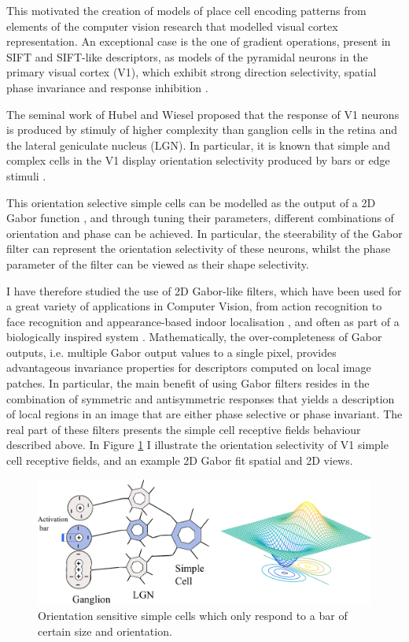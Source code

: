 This motivated the creation of models of place cell encoding patterns from elements of the computer vision research that modelled visual cortex representation. An exceptional case is the one of gradient operations, present in SIFT and SIFT-like descriptors, as models of the pyramidal neurons in the primary visual cortex (V1), which exhibit strong direction selectivity, spatial phase invariance and response inhibition \cite{hubel1962receptive, dhruv2014cascaded,carandini2006simple}.

The seminal work of Hubel and Wiesel \cite{hubel1962receptive} proposed that the response of V1 neurons is produced by stimuly of higher complexity than ganglion cells in the retina and the lateral geniculate nucleus (LGN). In particular, it is known that simple and complex cells in the V1 display orientation selectivity produced by bars or edge stimuli \cite{payne2001cat}.

This orientation selective simple cells can be modelled as the output of a 2D Gabor function \cite{daugman1985uncertainty}, and through tuning their parameters, different combinations of orientation and phase can be achieved. In particular, the steerability of the Gabor filter can represent the orientation selectivity of these neurons, whilst the phase parameter of the filter can be viewed as their shape selectivity. 

I have therefore studied the use of 2D Gabor-like filters, which have been used for a great variety of applications in Computer Vision, from action recognition \cite{shu2014bio} to face recognition \cite{liao2013partial} and appearance-based indoor localisation \cite{Rivera-Rubio2015PRL}, and often as part of a biologically inspired system \cite{shu2014bio}. Mathematically, the over-completeness of Gabor outputs, i.e. multiple Gabor output values to a single pixel, provides advantageous invariance properties for descriptors computed on local image patches. In particular, the main benefit of using Gabor filters resides in the combination of symmetric and antisymmetric responses that yields a description of local regions in an image that are either phase selective or phase invariant. The real part of these filters presents the simple cell receptive fields behaviour described above. In Figure \ref{fig:simple_cell} I illustrate the orientation selectivity of V1 simple cell receptive fields, and an example 2D Gabor fit spatial and 2D views.


\begin{figure}[h]
\centering
\includegraphics[width=.8\textwidth]{gfx/Chapter05/simple_cell_gabor.pdf}
\caption{Orientation sensitive simple cells which only respond to a bar of certain size and orientation.}
\label{fig:simple_cell}
\end{figure}

